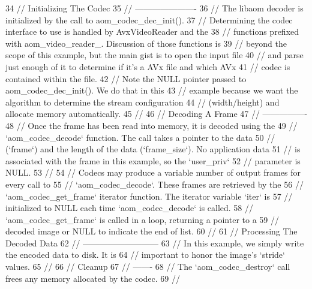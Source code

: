 \begin{DoxyCodeInclude}
34 \textcolor{comment}{// Initializing The Codec}
35 \textcolor{comment}{// ----------------------}
36 \textcolor{comment}{// The libaom decoder is initialized by the call to aom\_codec\_dec\_init().}
37 \textcolor{comment}{// Determining the codec interface to use is handled by AvxVideoReader and the}
38 \textcolor{comment}{// functions prefixed with aom\_video\_reader\_. Discussion of those functions is}
39 \textcolor{comment}{// beyond the scope of this example, but the main gist is to open the input file}
40 \textcolor{comment}{// and parse just enough of it to determine if it's a AVx file and which AVx}
41 \textcolor{comment}{// codec is contained within the file.}
42 \textcolor{comment}{// Note the NULL pointer passed to aom\_codec\_dec\_init(). We do that in this}
43 \textcolor{comment}{// example because we want the algorithm to determine the stream configuration}
44 \textcolor{comment}{// (width/height) and allocate memory automatically.}
45 \textcolor{comment}{//}
46 \textcolor{comment}{// Decoding A Frame}
47 \textcolor{comment}{// ----------------}
48 \textcolor{comment}{// Once the frame has been read into memory, it is decoded using the}
49 \textcolor{comment}{// `aom\_codec\_decode` function. The call takes a pointer to the data}
50 \textcolor{comment}{// (`frame`) and the length of the data (`frame\_size`). No application data}
51 \textcolor{comment}{// is associated with the frame in this example, so the `user\_priv`}
52 \textcolor{comment}{// parameter is NULL.}
53 \textcolor{comment}{//}
54 \textcolor{comment}{// Codecs may produce a variable number of output frames for every call to}
55 \textcolor{comment}{// `aom\_codec\_decode`. These frames are retrieved by the}
56 \textcolor{comment}{// `aom\_codec\_get\_frame` iterator function. The iterator variable `iter` is}
57 \textcolor{comment}{// initialized to NULL each time `aom\_codec\_decode` is called.}
58 \textcolor{comment}{// `aom\_codec\_get\_frame` is called in a loop, returning a pointer to a}
59 \textcolor{comment}{// decoded image or NULL to indicate the end of list.}
60 \textcolor{comment}{//}
61 \textcolor{comment}{// Processing The Decoded Data}
62 \textcolor{comment}{// ---------------------------}
63 \textcolor{comment}{// In this example, we simply write the encoded data to disk. It is}
64 \textcolor{comment}{// important to honor the image's `stride` values.}
65 \textcolor{comment}{//}
66 \textcolor{comment}{// Cleanup}
67 \textcolor{comment}{// -------}
68 \textcolor{comment}{// The `aom\_codec\_destroy` call frees any memory allocated by the codec.}
69 \textcolor{comment}{//}

\end{DoxyCodeInclude}

